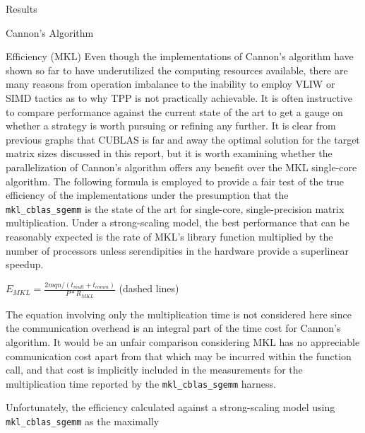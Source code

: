 \documentclass{article}
\begin{document}
\begin{section}{Results}
\begin{subsection}{Cannon's Algorithm}
\begin{paragraph}{}
\begin{tikzpicture}
      \end{tikzpicture}
    \end{paragraph}
    \begin{paragraph}{Efficiency (MKL)}
      Even though the implementations of Cannon's algorithm have shown so far to have underutilized the computing resources available,
      there are many reasons from operation imbalance to the inability to employ VLIW or SIMD tactics\autocite[][4-5]{Lecture10Slides}
      as to why TPP is not practically achievable. It is often instructive to compare performance against the current state of the art
      to get a gauge on whether a strategy is worth pursuing or refining any further. It is clear from previous graphs that CUBLAS is far
      and away the optimal solution for the target matrix sizes discussed in this report, but it is worth examining whether the
      parallelization of Cannon's algorithm offers any benefit over the MKL single-core algorithm. The following formula
      is employed to provide a fair test of the true efficiency of the implementations\autocite[][14]{Lecture10Slides} under
      the presumption that the \texttt{mkl\_cblas\_sgemm} is the state of the art for single-core, single-precision matrix multiplication.
      Under a strong-scaling model, the best performance that can be reasonably expected is the rate of MKL's library function multiplied
      by the number of processors unless serendipities in the hardware provide a superlinear speedup.
      \begin{subparagraph}{}
        $E_{MKL} = \frac{2mqn/(t_{mult}+t_{comm})}{P*R_{MKL}}$ (dashed lines)
      \end{subparagraph}
    \end{paragraph}
    \begin{paragraph}{}
      The equation involving only the multiplication time is not considered here since the communication overhead is an integral part
      of the time cost for Cannon's algorithm. It would be an unfair comparison considering MKL has no appreciable communication cost
      apart from that which may be incurred within the function call, and that cost is implicitly included in the measurements for
      the multiplication time reported by the \texttt{mkl\_cblas\_sgemm} harness.
    \end{paragraph}
    \begin{paragraph}{}
      Unfortunately, the efficiency calculated against a strong-scaling model using \texttt{mkl\_cblas\_sgemm} as the maximally

\end{paragraph}
\end{subsection}
\end{section}
\end{document}
